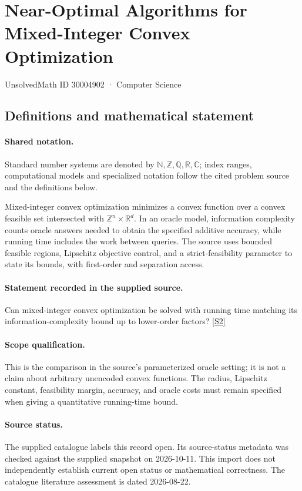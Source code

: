 \documentclass[11pt]{article}
\newcommand{\sref}[2]{\hyperlink{source:#1:#2}{[S#2]}}
\begin{document}
\setcounter{section}{30004901}
\section{Near-Optimal Algorithms for Mixed-Integer Convex Optimization}\label{30004902}
{\small\sffamily UnsolvedMath ID 30004902 · Computer Science}
\subsection{Definitions and mathematical statement}

\paragraph{Shared notation.}Standard number systems are denoted by $\mathbb N,\mathbb Z,\mathbb Q,\mathbb R,\mathbb C$; index ranges, computational models and specialized notation follow the cited problem source and the definitions below.


Mixed-integer convex optimization minimizes a convex function over a convex feasible set intersected with $\mathbb Z^n\times\mathbb R^d$. In an oracle model, information complexity counts oracle answers needed to obtain the specified additive accuracy, while running time includes the work between queries. The source uses bounded feasible regions, Lipschitz objective control, and a strict-feasibility parameter to state its bounds, with first-order and separation access.
\paragraph{Statement recorded in the supplied source.}
Can mixed-integer convex optimization be solved with running time matching its information-complexity bound up to lower-order factors? \sref{30004902}{2}
\paragraph{Scope qualification.}
This is the comparison in the source's parameterized oracle setting; it is not a claim about arbitrary unencoded convex functions. The radius, Lipschitz constant, feasibility margin, accuracy, and oracle costs must remain specified when giving a quantitative running-time bound.
\paragraph{Source status.}
The supplied catalogue labels this record open. Its source-status metadata was checked against the supplied snapshot on 2026-10-11. This import does not independently establish current open status or mathematical correctness. The catalogue literature assessment is dated 2026-08-22.
\end{document}
